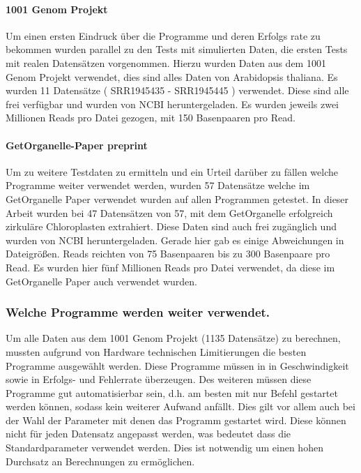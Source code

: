 \documentclass{scrartcl}
\begin{document}
\paragraph{1001 Genom Projekt}
\label{sec-3-1-1-2}
Um einen ersten Eindruck über die Programme und deren Erfolgs rate zu bekommen wurden parallel zu den Tests mit simulierten Daten, die ersten Tests mit realen Datensätzen vorgenommen. 
Hierzu wurden Daten aus dem 1001 Genom Projekt\footnotemark[38]{} verwendet, dies sind alles Daten von Arabidopsis thaliana. Es wurden 11 Datensätze ( SRR1945435 - SRR1945445 ) verwendet. Diese sind alle
frei verfügbar und wurden von NCBI heruntergeladen. Es wurden jeweils zwei Millionen Reads pro Datei gezogen, mit 150 Basenpaaren pro Read. 

\paragraph{GetOrganelle-Paper preprint}
\label{sec-3-1-1-3}
Um zu weitere Testdaten zu ermitteln und ein Urteil darüber zu fällen welche Programme weiter verwendet werden,
wurden 57 Datensätze welche im GetOrganelle Paper \footnotemark[28]{} verwendet wurden
auf allen Programmen getestet. In dieser Arbeit wurden bei 47 Datensätzen von 57, mit
dem GetOrganelle erfolgreich zirkuläre Chloroplasten extrahiert. Diese Daten sind auch frei zugänglich und wurden
von NCBI heruntergeladen. Gerade hier gab es einige Abweichungen in Dateigrößen. Reads reichten von 75 Basenpaaren 
bis zu 300 Basenpaare pro Read. Es wurden hier fünf Millionen Reads pro Datei verwendet, da diese im GetOrganelle Paper
auch verwendet wurden.

\subsubsection{Welche Programme werden weiter verwendet.}
\label{sec-3-1-2}
Um alle Daten aus dem 1001 Genom Projekt (1135 Datensätze) zu berechnen, mussten aufgrund 
von Hardware technischen Limitierungen die besten Programme ausgewählt werden. Diese Programme müssen in
in Geschwindigkeit sowie in Erfolgs- und Fehlerrate überzeugen. Des weiteren müssen diese Programme gut automatisierbar sein, 
d.h. am besten mit nur Befehl gestartet werden können, sodass kein weiterer Aufwand anfällt. Dies gilt
vor allem auch bei der Wahl der Parameter mit denen das Programm gestartet wird. Diese können nicht 
für jeden Datensatz angepasst werden, was bedeutet dass die Standardparameter verwendet werden.
Dies ist notwendig um einen hohen Durchsatz an Berechnungen zu ermöglichen.
\end{document}
